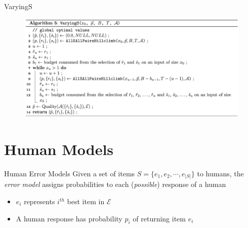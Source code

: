 \documentclass{beamer}
\begin{document}
\begin{frame}{VaryingS}

		\begin{figure}
			\centering
			\includegraphics[scale=0.33]{images/varyings.png}
		\end{figure}


\end{frame}

\section{Human Models}
\begin{frame}
\end{frame}

\begin{frame}{Human Error Models}
	Given a set of items $S = \{ e_1, e_2, \cdots, e_{\left\vert{S}\right\vert} \}$ to humans, the\\ \textit{\color{beaver_red}error model} assigns probabilities to each (\textit{possible}) response of a human
	\begin{itemize}
		\item $e_i$ represents $i^{th}$ best item in $\mathcal{E}$
		\item A human response has probability $p_i $ of returning item $e_i$
	\end{itemize}
\end{frame}
\end{document}
